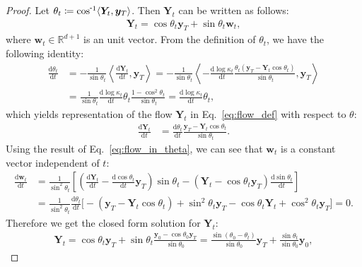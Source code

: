 \begin{proof}
Let $\theta_t\coloneqq \invcos \langle \bm{Y}_t,\bm{y}_T \rangle$. Then $\bm{Y}_t$ can be written as follows:
\begin{align}
    \bm{Y}_t = \cos\theta_t\bm{y}_T + \sin\theta_t\bm{w}_t,
\end{align}
where $\bm{w}_t\in\mathbb{R}^{d+1}$ is an unit vector.
From the definition of $\theta_t$, we have the following identity:
\begin{align}
    \frac{\mathrm{d}\theta_t}{\mathrm{d}t} 
    &= -\frac{1}{\sin\theta_t} \left\langle \frac{\mathrm{d}\bm{Y}_t}{\mathrm{d}t}, \bm{y}_T \right\rangle
    = -\frac{1}{\sin\theta_t} \left\langle -\frac{\mathrm{d}\log\kappa_t}{\mathrm{d}t}
    \frac{\theta_t(\bm{y}_T - \bm{Y}_t\cos\theta_t)}{\sin\theta_t}, \bm{y}_T \right\rangle \\
    &= \frac{1}{\sin\theta_t}\frac{\mathrm{d}\log\kappa_t}{\mathrm{d}t} \theta_t \frac{1 - \cos^2\theta_t}{\sin\theta_t}
    = \frac{\mathrm{d}\log\kappa_t}{\mathrm{d}t} \theta_t ,
\label{eq:theta_derivative}
\end{align}
which yields representation of the flow $\bm{Y}_t$ in Eq.~\eqref{eq:flow_def} with respect to $\theta$:
\begin{align}
    \frac{\mathrm{d}\bm{Y}_t}{\mathrm{d}t} 
    &= \frac{\mathrm{d}\theta_t}{\mathrm{d}t}\frac{\bm{y}_T - \bm{Y}_t\cos\theta_t}{\sin\theta_t}.
\label{eq:flow_in_theta}
\end{align}
Using the result of Eq.~\eqref{eq:flow_in_theta}, we can see that $\bm{w}_t$ is a constant vector independent of $t$:
\begin{align}
    \frac{\mathrm{d}\bm{w}_t}{\mathrm{d}t} 
    &= \frac{1}{\sin^2\theta_t}
    \left[\left(\frac{\mathrm{d}\bm{Y}_t}{\mathrm{d}t} - \frac{\mathrm{d}\cos\theta_t}{\mathrm{d}t}\bm{y}_T\right)\sin\theta_t - \left(\bm{Y}_t - \cos\theta_t\bm{y}_T\right)\frac{\mathrm{d}\sin\theta_t}{\mathrm{d}t}\right] \\
    &= \frac{1}{\sin^2\theta_t}\frac{\mathrm{d}\theta_t}{\mathrm{d}t}
    \Big[
        -(\bm{y}_T - \bm{Y}_t\cos\theta_t) + \sin^2{\theta_t}\bm{y}_T
        - \cos\theta_t\bm{Y}_t  + \cos^2\theta_t\bm{y}_T
    \Big]
    =0.
\end{align}
Therefore we get the closed form solution for $\bm{Y}_t$:
\begin{align}
    \bm{Y}_t = \cos\theta_t\bm{y}_T + \sin\theta_t\frac{\bm{y}_0 - \cos\theta_0\bm{y}_T}{\sin\theta_0}
    = \frac{\sin(\theta_0-\theta_t)}{\sin\theta_0}\bm{y}_T + \frac{\sin\theta_t}{\sin\theta_0}\bm{y}_0 ,

\end{align}
\end{proof}
